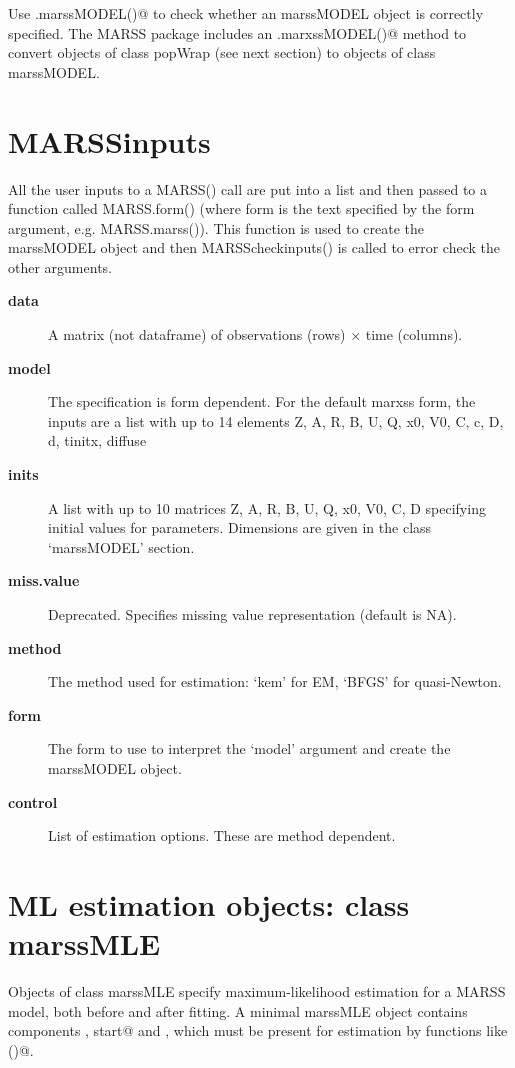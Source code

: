 Use \verb@is.marssMODEL()@ to check whether an marssMODEL object is correctly specified. The MARSS package includes an \verb@as.marxssMODEL()@ method to convert objects of class popWrap (see next section) to objects of class marssMODEL. 

\section*{MARSSinputs}

All the user inputs to a MARSS() call are put into a list and then passed to a function called MARSS.form() (where form is the text specified by the form argument, e.g. MARSS.marss()).  This function is used to create the marssMODEL object and then MARSScheckinputs() is called to error check the other arguments.

  \begin{description}
  
  \item[\textbf{data}]{ A matrix (not dataframe) of observations (rows) $\times$ time (columns).  }
  \item[\textbf{model}]{ The specification is form dependent.  For the default marxss form, the inputs are a list with up to 14  elements Z, A, R, B, U, Q, x0, V0, C, c, D, d, tinitx, diffuse }
  \item[\textbf{inits}]{ A list with up to 10 matrices Z, A, R, B, U, Q, x0, V0, C, D specifying initial values for parameters. Dimensions are given in the class `marssMODEL' section. }
  \item[\textbf{miss.value}]{ Deprecated. Specifies missing value representation (default is NA). }
  \item[\textbf{method}]{ The method used for estimation: `kem' for EM, `BFGS' for quasi-Newton.}
  \item[\textbf{form}]{ The form to use to interpret the `model' argument and create the marssMODEL object.}
  \item[\textbf{control}]{ List of estimation options. These are method dependent. }  
  \end{description}


\section*{ML estimation objects: class marssMLE}

Objects of class marssMLE specify maximum-likelihood estimation for a MARSS model, both before and after fitting. A minimal marssMLE object contains components \verb@model, start@ and \verb@control@, which must be present for estimation by functions like \verb@MARSSkem()@.

